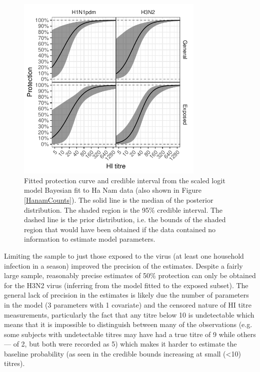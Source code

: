 \documentclass[12pt]{article}
\begin{document}
\pagebreak

\begin{figure}[htp]
	\centering
	\includegraphics[width=0.8\textwidth]{../fit-sclr-bayesian-plot/hanam-hi-prot.pdf}
	\caption{
	Fitted protection curve and credible interval from the scaled logit model Bayesian fit to Ha Nam data (also shown in Figure \ref{HanamCounts}). The solid line is the median of the posterior distribution. The shaded region is the 95\% credible interval. The dashed line is the prior distribution, i.e. the bounds of the shaded region that would have been obtained if the data contained no information to estimate model parameters.
	}
	\label{SclrBayesProt}
\end{figure}

Limiting the sample to just those exposed to the virus (at least one household infection in a season) improved the precision of the estimates. Despite a fairly large sample, reasonably precise estimates of 50\% protection can only be obtained for the H3N2 virus (inferring from the model fitted to the exposed subset). The general lack of precision in the estimates is likely due the number of parameters in the model (3 parameters with 1 covariate) and the censored nature of HI titre measurements, particularly the fact that any titre below 10 is undetectable which means that it is impossible to distinguish between many of the observations (e.g. some subjects with undetectable titres may have had a true titre of 9 while others --- of 2, but both were recorded as 5) which makes it harder to estimate the baseline probability (as seen in the credible bounds increasing at small (<10) titres).
\end{document}
